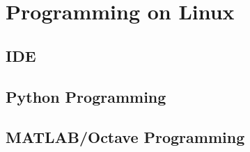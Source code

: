 \chapter{Programming on Linux} \label{ch:pol}

\section{IDE}

\section{Python Programming}

\section{MATLAB/Octave Programming}

